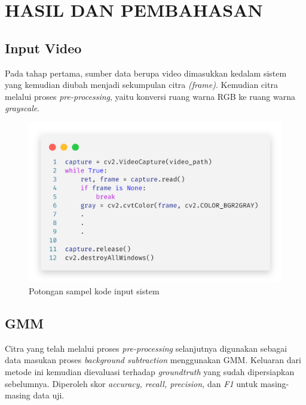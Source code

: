 
\chapter{HASIL DAN PEMBAHASAN}
    \section{Input Video}
        Pada tahap pertama, sumber data berupa video dimasukkan kedalam sistem yang kemudian diubah menjadi sekumpulan citra \textit{(frame)}. Kemudian citra melalui proses \textit{pre-processing}, yaitu konversi ruang warna RGB ke ruang warna \textit{grayscale}.
        \vspace{-0.5cm}
        \begin{figure}[H]
        \centering
          \singlespacing
          \captionsetup{justification=centering,margin=0.5cm}
          \includegraphics[width=12cm]{image/input.png}
          \caption{Potongan sampel kode input sistem}
          \label{fig:Potongan sampel kode input sistem}
        \end{figure}

    \section{GMM}
        Citra yang telah melalui proses \textit{pre-processing} selanjutnya digunakan sebagai data masukan proses \textit{background subtraction} menggunakan GMM. Keluaran dari metode ini kemudian dievaluasi terhadap \textit{groundtruth} yang sudah dipersiapkan sebelumnya. Diperoleh skor \textit{accuracy, recall, precision,} dan \textit{F1} untuk masing-masing data uji.

